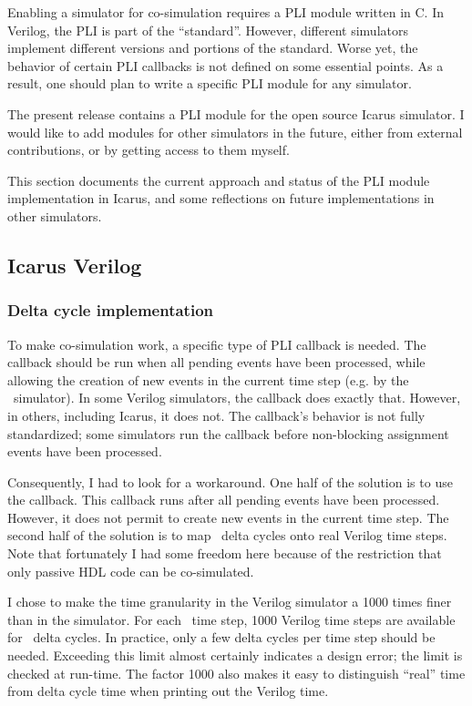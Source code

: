 Enabling a simulator for co-simulation requires a PLI module written
in C. In Verilog, the PLI is part of the ``standard''.  However,
different simulators implement different versions and portions of the
standard. Worse yet, the behavior of certain PLI callbacks is not
defined on some essential points.  As a result, one should plan to
write a specific PLI module for any simulator.

The present release contains a PLI module for the open source Icarus
simulator. I would like to add modules for other simulators in the
future, either from external contributions, or by getting access to
them myself.

This section documents the current approach and status of the PLI
module implementation in Icarus, and some reflections on future
implementations in other simulators.

\subsection{Icarus Verilog}

\subsubsection{Delta cycle implementation}
\label{icarus-delta-cycles}

To make co-simulation work, a specific type of PLI callback is
needed. The callback should be run when all pending events have been
processed, while allowing the creation of new events in the current
time step (e.g. by the \myhdl\ simulator).  In some Verilog
simulators, the  callback does exactly
that. However, in others, including Icarus, it does not. The
callback's behavior is not fully standardized; some simulators run the
callback before non-blocking assignment events have been processed.

Consequently, I had to look for a workaround. One half of the solution
is to use the  callback.  This callback runs
after all pending events have been processed.  However, it does not
permit to create new events in the current time step.  The second half
of the solution is to map \myhdl\ delta cycles onto real Verilog time
steps.  Note that fortunately I had some freedom here because of the
restriction that only passive HDL code can be co-simulated.

I chose to make the time granularity in the Verilog simulator a 1000
times finer than in the \myhdl{} simulator. For each \myhdl\ time
step, 1000 Verilog time steps are available for \myhdl\ delta
cycles. In practice, only a few delta cycles per time step should be
needed. Exceeding this limit almost certainly indicates a design error;
the limit is checked at run-time. The factor 1000 also makes it
easy to distinguish ``real'' time from delta cycle time when printing
out the Verilog time.

